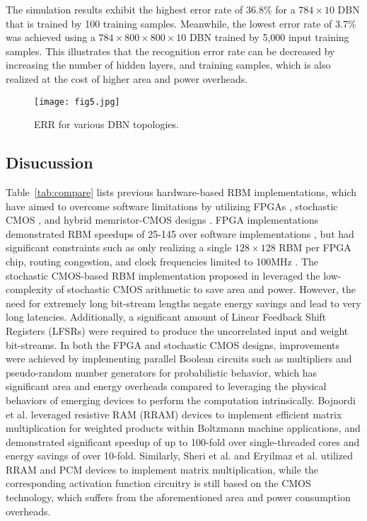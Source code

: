The simulation results exhibit the highest error rate of 36.8\% for a $784 \times 10$ DBN that is trained by 100 training samples. Meanwhile, the lowest error rate of 3.7\% was achieved using a $784 \times 800 \times 800 \times 10$ DBN trained by 5,000 input training samples. This illustrates that the recognition error rate can be decreased by increasing the number of hidden layers, and training samples, which is also realized at the cost of higher area and power overheads.


\begin{figure}
\texttt{[image: fig5.jpg]}
\vspace{-0.2cm}
\caption{ERR for various DBN topologies.}
\vspace{-0.4cm}
\end{figure}



\subsection{Disucussion}
Table~\ref{tab:compare} lists previous hardware-based RBM implementations, which have aimed to overcome software limitations by utilizing FPGAs \cite{Kim2010,Ly2010}, stochastic CMOS \cite{Ardakani2017}, and hybrid memristor-CMOS designs \cite{SHERI2015,Bojnordi2016,Eryilmaz2016}. FPGA implementations demonstrated RBM speedups of 25-145 over software implementations \cite{Kim2010,Ly2010}, but had significant constraints such as only realizing a single $128 \times 128$ RBM per FPGA chip, routing congestion, and clock frequencies limited to 100MHz \cite{Ly2010}. The stochastic CMOS-based RBM implementation proposed in \cite{Ardakani2017} leveraged the low-complexity of stochastic CMOS arithmetic to save area and power. However, the need for extremely long bit-stream lengths negate energy savings and lead to very long latencies. Additionally, a significant amount of Linear Feedback Shift Registers (LFSRs) were required to produce the uncorrelated input and weight bit-streams. In both the FPGA and stochastic CMOS designs, improvements were achieved by implementing parallel Boolean circuits such as multipliers and pseudo-random number generators for probabilistic behavior, which has significant area and energy overheads compared to leveraging the physical behaviors of emerging devices to perform the computation intrinsically. Bojnordi et al. \cite{Bojnordi2016} leveraged resistive RAM (RRAM) devices to implement efficient matrix multiplication for weighted products within Boltzmann machine applications, and demonstrated significant speedup of up to 100-fold over single-threaded cores and energy savings of over 10-fold. Similarly, Sheri et al. \cite{SHERI2015} and Eryilmaz et al. \cite{Eryilmaz2016} utilized RRAM and PCM devices to implement matrix multiplication, while the corresponding activation function circuitry is still based on the CMOS technology, which suffers from the aforementioned area and power consumption overheads.

